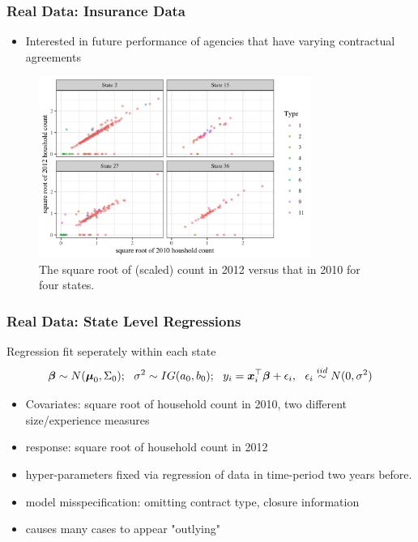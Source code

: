 \documentclass{beamer}
\def\bbeta{\mbox{\boldmath $\beta$}}
\def\bmu{\mbox{\boldmath $\mu$}}
\newcommand{\bx}{\mbox{\boldmath $x$}}
\newcommand{\iid}{\stackrel{iid}{\sim}}
\begin{document}
\begin{frame}
\frametitle{Real Data: Insurance Data}
\begin{itemize}
	\item Interested in future performance of agencies that have varying contractual agreements
\end{itemize}
	\begin{figure}[t]
		\centering
		\includegraphics[width=3.5in]{scatter_by_state.png}
		\caption{The square root of (scaled) count in 2012 versus that in 2010 for four states.}
		\label{fig:ctVct}
	\end{figure}
\end{frame}


\begin{frame}
\frametitle{Real Data: State Level Regressions}
Regression fit seperately within each state
\begin{equation*}
\label{eq:regModel}
\bbeta\sim N(\bmu_0, \Sigma_0);\ \ \sigma^2\sim IG(a_0,b_0);\ \  
y_{i}=\bx_{i}^{\top}\bbeta+\epsilon_{i},\ \ \epsilon_{i}\iid N(0, \sigma^2)
\end{equation*}	
\begin{itemize}
	\item Covariates: square root of household count in 2010, two different size/experience measures
	\item response: square root of household count in 2012
	\item hyper-parameters fixed via regression of data in time-period two years before. 
	\item model misspecification: omitting contract type, closure information 
	\item causes many cases to appear "outlying"
\end{itemize}
\end{frame}
\end{document}
